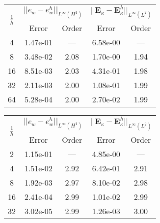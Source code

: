 \begin{table}[hp]
	\centering
	\begin{tabular}{ccccc}
		\hline 
		\multirow{2}{*}{$\frac{1}{h}$} & \multicolumn{2}{c}{$||e_w - e_w^h||_{L^{\infty}(H^1)}$}  & \multicolumn{2}{c}{$||\bm{E}_\kappa - \bm{E}_\kappa^h||_{L^{\infty}(L^2)}$}   \\ 
		& Error & Order  & Error & Order  \\
		\hline 
		4  & 1.47e-01 & ---  & 6.58e-00 & ---  \\ 
		8  & 3.48e-02 & 2.08 & 1.70e-00 & 1.94 \\ 
		16 & 8.51e-03 & 2.03 & 4.31e-01 & 1.98 \\ 
		32 & 2.11e-03 & 2.00 & 1.08e-01 & 1.99 \\ 
		64 & 5.28e-04 & 2.00 & 2.70e-02 & 1.99 \\ 
		\hline 
	\end{tabular} 
	\captionsetup{width=0.95\linewidth}
	\vspace{1mm}
	\label{tab:reskirHHJ_SSSS_k2}
\end{table}

\begin{table}[hp]
	\centering
	\begin{tabular}{ccccc}
		\hline 
		\multirow{2}{*}{$\frac{1}{h}$} & \multicolumn{2}{c}{$||e_w - e_w^h||_{L^{\infty}(H^1)}$}  & \multicolumn{2}{c}{$||\bm{E}_\kappa - \bm{E}_\kappa^h||_{L^{\infty}(L^2)}$}   \\ 
		& Error & Order  & Error & Order  \\
		\hline 
		2  & 1.15e-01 & ---  & 4.85e-00 & ---  \\ 
		4  & 1.51e-02 & 2.92 & 6.42e-01 & 2.91 \\ 
		8  & 1.92e-03 & 2.97 & 8.10e-02 & 2.98 \\ 
		16 & 2.41e-04 & 2.99 & 1.01e-02 & 2.99 \\ 
		32 & 3.02e-05 & 2.99 & 1.26e-03 & 3.00 \\ 
		\hline 
	\end{tabular} 
	\captionsetup{width=0.95\linewidth}
	\vspace{1mm}
	\label{tab:reskirHHJ_SSSS_k3}
\end{table}

